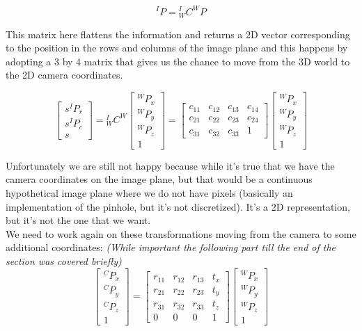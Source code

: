 \[
    {}^IP = {}^I_W C^WP
\]

This matrix here flattens the information and returns a 2D vector corresponding to the position in the rows and columns of the image plane and this happens by adopting a 3 by 4 matrix that gives us the chance to move from the 3D world to the 2D camera coordinates.

\[
    \begin{bmatrix}
        s^IP_r \\
        s^IP_c \\
        s
    \end{bmatrix}
    =
    {}^I_W C^W
    \begin{bmatrix}
        {}^WP_x \\
        {}^WP_y \\
        {}^WP_z \\
        1
    \end{bmatrix}  
    = 
    \begin{bmatrix}
        c_{11} & c_{12} & c_{13} & c_{14} \\
        c_{21} & c_{22} & c_{23} & c_{24} \\
        c_{31} & c_{32} & c_{33} & 1
    \end{bmatrix}
    \begin{bmatrix}
        {}^WP_x \\
        {}^WP_y \\
        {}^WP_z \\
        1
    \end{bmatrix}
\]

Unfortunately we are still not happy because while it's true that we have the camera coordinates on the image plane, but that would be a continuous hypothetical image plane where we do not have pixels (basically an implementation of the pinhole, but it's not discretized). It's a 2D representation, but it's not the one that we want.
\\
We need to work again on these transformations moving from the camera to some additional coordinates:
\textit{(While important the following part till the end of the section was covered briefly)}
\[
    \begin{bmatrix}
        {}^CP_x \\
        {}^CP_y \\
        {}^CP_z \\
        1
    \end{bmatrix}
    =
    \begin{bmatrix}
       r_{11} & r_{12} & r_{13} & t_x \\
       r_{21} & r_{22} & r_{23} & t_y \\
       r_{31} & r_{32} & r_{33} & t_z \\
        0 & 0 & 0 & 1
    \end{bmatrix}
    \begin{bmatrix}
        {}^WP_x \\
        {}^WP_y \\
        {}^WP_z \\
        1
    \end{bmatrix}   
\]

